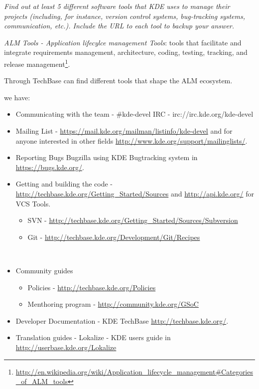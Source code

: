 \documentclass[11pt]{scrartcl}
\begin{document}
\emph{Find out at least 5 different software tools that \emph{KDE} uses to manage their projects (including, for instance, version control systems, bug-tracking systems, communication, etc.). Include the URL to each tool to backup your answer.}

\emph{ALM Tools - Application lifecylce management Tools}: tools that facilitate and integrate requirements management, architecture, coding, testing, tracking, and release management\footnote{\url{http://en.wikipedia.org/wiki/Application_lifecycle_management\#Categories_of_ALM_tools}}.

\par Through TechBase can find different tools that shape the ALM ecosystem.

we have:

\begin{itemize}

	\item Communicating with the team - \#kde-devel IRC - irc://irc.kde.org/kde-devel
	\item Mailing List - \url{https://mail.kde.org/mailman/listinfo/kde-devel} and for anyone interested in other fields \url{http://www.kde.org/support/mailinglists/}.

	\item Reporting Bugs Bugzilla using KDE Bugtracking system in \url{https://bugs.kde.org/}.

	\item Getting and building the code - \url{http://techbase.kde.org/Getting_Started/Sources} and \url{http://api.kde.org/} for VCS Tools.

    \begin{itemize}
	    \item SVN - \url{http://techbase.kde.org/Getting_Started/Sources/Subversion}
	    \item Git - \url{http://techbase.kde.org/Development/Git/Recipes}
    \end{itemize}
    
	\item Community guides

    \begin{itemize}
        \item Policies - \url{http://techbase.kde.org/Policies}
     	\item Menthoring program - \url{http://community.kde.org/GSoC}
    \end{itemize}

	\item Developer Documentation - KDE TechBase \url{http://techbase.kde.org/}.
	\item Translation guides - Lokalize - KDE users guide in \url{http://userbase.kde.org/Lokalize}

\end{itemize}

\end{document}
